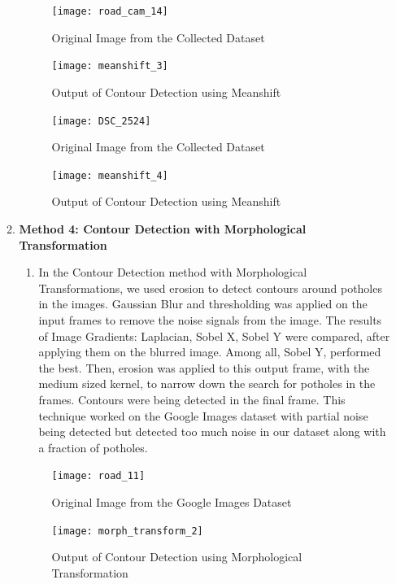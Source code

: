 \begin{enumerate}
\begin{enumerate}
    
    \begin{figure}[ht!]
        \centering
        \texttt{[image: road\_cam\_14]}
        \caption{Original Image from the Collected Dataset}
    \end{figure}

    \begin{figure}[ht!]
        \centering
        \texttt{[image: meanshift\_3]}
        \caption{Output of Contour Detection using Meanshift}
    \end{figure}
    \pagebreak
    
    \begin{figure}[ht!]
        \centering
        \texttt{[image: DSC\_2524]}
        \caption{Original Image from the Collected Dataset}
    \end{figure}

    \begin{figure}[ht!]
        \centering
        \texttt{[image: meanshift\_4]}
        \caption{Output of Contour Detection using Meanshift}
    \end{figure}
    \pagebreak
    
    \item \textbf{Method 4: Contour Detection with Morphological Transformation}
    \begin{enumerate}
        \item In the Contour Detection method with Morphological Transformations, we used erosion to detect contours around potholes in the images. Gaussian Blur and thresholding was applied on the input frames to remove the noise signals from the image. The results of Image Gradients: Laplacian, Sobel X, Sobel Y were compared, after applying them on the blurred image. Among all, Sobel Y, performed the best. Then, erosion was applied to this output frame, with the medium sized kernel, to narrow down the search for potholes in the frames. Contours were being detected in the final frame. This technique worked on the Google Images dataset with partial noise being detected but detected too much noise in our dataset along with a fraction of potholes.
    \end{enumerate}
    \begin{figure}[ht!]
        \centering
        \texttt{[image: road\_11]}
        \caption{Original Image from the Google Images Dataset}
    \end{figure}

    \begin{figure}[ht!]
        \centering
        \texttt{[image: morph\_transform\_2]}
        \caption{Output of Contour Detection using Morphological Transformation}
    \end{figure}
    \pagebreak
    

\end{enumerate}
\end{enumerate}
